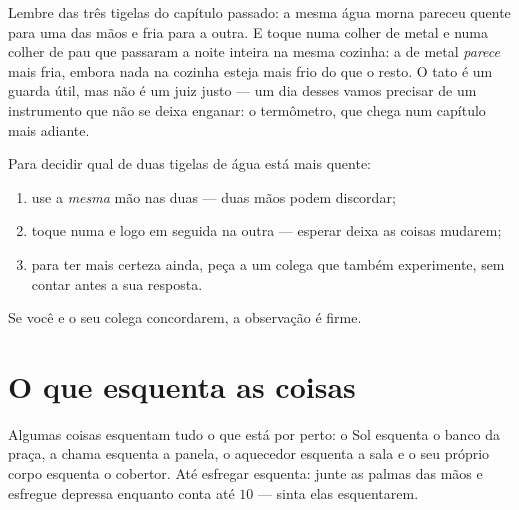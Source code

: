\begin{remark}\label{rem:g1:hot-and-cold:fooled}
Lembre das três tigelas do capítulo passado: a mesma água morna
pareceu quente para uma das mãos e fria para a outra. E toque numa
colher de metal e numa colher de pau que passaram a noite inteira na
mesma cozinha: a de metal \emph{parece} mais fria, embora nada na
cozinha esteja mais frio do que o resto. O tato é um guarda útil, mas
não é um juiz justo --- um dia desses vamos precisar de um
instrumento que não se deixa enganar: o termômetro, que chega num
capítulo mais adiante.
\end{remark}

\begin{method}\label{met:g1:hot-and-cold:compare}
Para decidir qual de duas tigelas de água está mais quente:
\begin{enumerate}
  \item use a \emph{mesma} mão nas duas --- duas mãos podem discordar;
  \item toque numa e logo em seguida na outra --- esperar deixa as
        coisas mudarem;
  \item para ter mais certeza ainda, peça a um colega que também
        experimente, sem contar antes a sua resposta.
\end{enumerate}
Se você e o seu colega concordarem, a observação é firme.
\end{method}

\section{O que esquenta as coisas}

\begin{example}[Aquecedores]\label{ex:g1:hot-and-cold:warmers}
Algumas coisas esquentam tudo o que está por perto: o Sol esquenta o
banco da praça, a chama esquenta a panela, o aquecedor esquenta a
sala e o seu próprio corpo esquenta o cobertor. Até esfregar
esquenta: junte as palmas das mãos e esfregue depressa enquanto conta
até $10$ --- sinta elas esquentarem.
\end{example}

